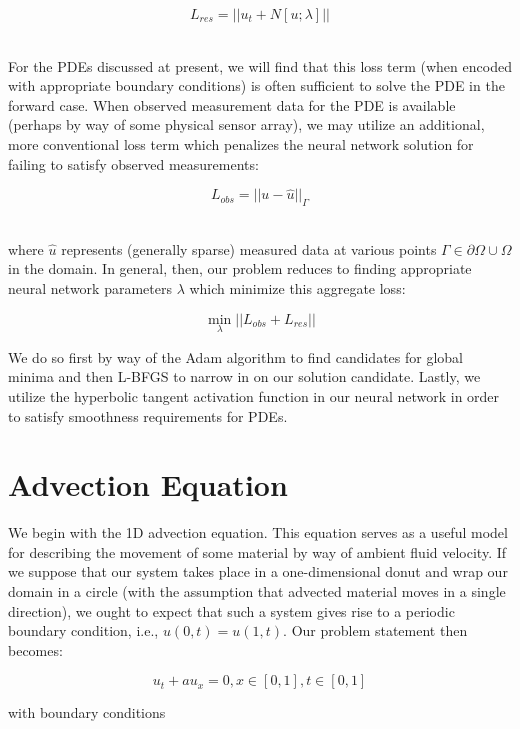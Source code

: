 \documentclass[letterpaper,11pt]{article}
\begin{document}
    $$
    L_{res} = ||u_t + N[u; \lambda]||
    $$

    \ \\
    For the PDEs discussed at present, we will find that this loss term (when encoded with appropriate boundary 
    conditions) is often sufficient to solve the PDE in the forward case. When observed measurement data for the PDE 
    is available (perhaps by way of some physical sensor array), we may utilize an additional, more conventional loss 
    term which penalizes the neural network solution for failing to satisfy observed measurements:

    $$
    L_{obs} = ||u - \hat{u}||_{\Gamma}
    $$

    \ \\
    \noindent where $\hat{u}$ represents (generally sparse) measured data at various points 
    $\Gamma \in \partial \Omega \cup \Omega$ in the domain. In general, then, our problem reduces to finding appropriate
    neural network parameters $\lambda$ which minimize this aggregate loss:
    
    \begin{equation}
        \min_{\lambda}{||L_{obs} + L_{res}||}
    \end{equation}

    We do so first by way of the Adam\cite{adam} algorithm to find candidates for global minima and then L-BFGS to 
    narrow in on our solution candidate. Lastly, we utilize the hyperbolic tangent activation function in our neural 
    network in order to satisfy smoothness requirements for PDEs.

    \section{Advection Equation}{\label{sec:advection-equation}}
    We begin with the 1D advection equation. This equation serves as a useful model for describing the movement of some
    material by way of ambient fluid velocity. If we suppose that our system takes place in a one-dimensional donut and
    wrap our domain in a circle (with the assumption that advected material moves in a single direction), we ought to
    expect that such a system gives rise to a periodic boundary condition, i.e., $u(0, t) = u(1, t)$. Our problem
    statement then becomes:

    $$
    u_t + a u_x = 0, x \in [0, 1], t \in [0, 1]
    $$

    \noindent with boundary conditions
\end{document}

